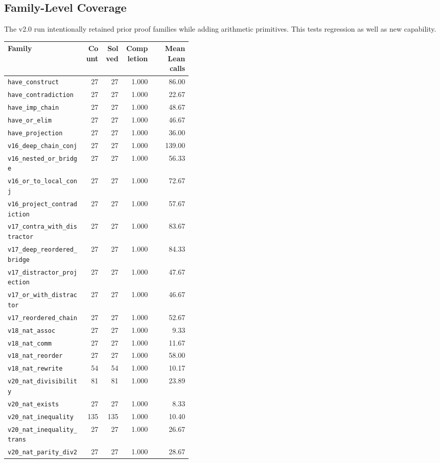 \documentclass[11pt]{article}
\begin{document}
\subsection{Family-Level Coverage}

The v2.0 run intentionally retained prior proof families while adding arithmetic primitives. This tests regression as
well as new capability.

\begin{longtable}{p{0.42\linewidth}rrrr}
\toprule
Family & Count & Solved & Completion & Mean Lean calls \\
\midrule
\endhead
\texttt{have\_construct} & 27 & 27 & 1.000 & 86.00 \\
\texttt{have\_contradiction} & 27 & 27 & 1.000 & 22.67 \\
\texttt{have\_imp\_chain} & 27 & 27 & 1.000 & 48.67 \\
\texttt{have\_or\_elim} & 27 & 27 & 1.000 & 46.67 \\
\texttt{have\_projection} & 27 & 27 & 1.000 & 36.00 \\
\texttt{v16\_deep\_chain\_conj} & 27 & 27 & 1.000 & 139.00 \\
\texttt{v16\_nested\_or\_bridge} & 27 & 27 & 1.000 & 56.33 \\
\texttt{v16\_or\_to\_local\_conj} & 27 & 27 & 1.000 & 72.67 \\
\texttt{v16\_project\_contradiction} & 27 & 27 & 1.000 & 57.67 \\
\texttt{v17\_contra\_with\_distractor} & 27 & 27 & 1.000 & 83.67 \\
\texttt{v17\_deep\_reordered\_bridge} & 27 & 27 & 1.000 & 84.33 \\
\texttt{v17\_distractor\_projection} & 27 & 27 & 1.000 & 47.67 \\
\texttt{v17\_or\_with\_distractor} & 27 & 27 & 1.000 & 46.67 \\
\texttt{v17\_reordered\_chain} & 27 & 27 & 1.000 & 52.67 \\
\texttt{v18\_nat\_assoc} & 27 & 27 & 1.000 & 9.33 \\
\texttt{v18\_nat\_comm} & 27 & 27 & 1.000 & 11.67 \\
\texttt{v18\_nat\_reorder} & 27 & 27 & 1.000 & 58.00 \\
\texttt{v18\_nat\_rewrite} & 54 & 54 & 1.000 & 10.17 \\
\texttt{v20\_nat\_divisibility} & 81 & 81 & 1.000 & 23.89 \\
\texttt{v20\_nat\_exists} & 27 & 27 & 1.000 & 8.33 \\
\texttt{v20\_nat\_inequality} & 135 & 135 & 1.000 & 10.40 \\
\texttt{v20\_nat\_inequality\_trans} & 27 & 27 & 1.000 & 26.67 \\
\texttt{v20\_nat\_parity\_div2} & 27 & 27 & 1.000 & 28.67 \\
\bottomrule
\end{longtable}
\end{document}

